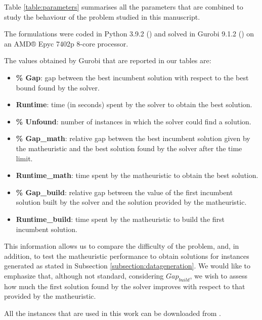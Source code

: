 \documentclass[a4paper,  review, authoryear, 1p.]{elsarticle}
\newcommand{\JP}[1]{{\color{blue}#1}}
\newcommand{\CV}[1]{{\color{blue}#1}}
\begin{document}
		\CV{Table \ref{table:parameters} summarises all the parameters that are combined to study the behaviour of the problem studied in this manuscript.}
		
		

		The formulations were coded in Python 3.9.2 (\citet{g.vanrossumguido1995}) and solved in Gurobi 9.1.2 (\citet{gurobioptimizationllc2022a}) on an AMD® Epyc 7402p 8-core processor. 
		
		\CV{
		The values obtained by Gurobi that are reported in our tables are:
		\begin{itemize}
			\item \textbf{\% Gap}: gap between the best incumbent solution with respect to the best bound found by the solver.
			\item \textbf{Runtime}: time (in seconds) spent by the solver to obtain the best solution.
			\item \textbf{\% Unfound}: number of instances in which the solver could find a solution.
			\item \textbf{\% Gap\_{math}}: relative gap between the best incumbent solution given by the matheuristic and the best solution found by the solver after the time limit.
			\item \textbf{Runtime\_{math}}: time spent by the matheuristic to obtain the best solution.
			\item \textbf{\% Gap\_{build}}: relative gap between the value of the first incumbent solution built by the solver and the solution provided by the matheuristic.
			\item \textbf{Runtime\_{build}}: time spent by the matheuristic to build the first incumbent solution.
		\end{itemize}
		
		This information allows us to compare the difficulty of the problem, and, in addition, to test the matheuristic performance to obtain solutions for instances generated as stated in Subsection \ref{subsection:datageneration}. \JP{We would like to emphasize that, although not standard,  considering $Gap_{build}$, we wish to assess  how much the first solution found by the solver improves with respect to that provided by the matheuristic.}}
		
		\CV{All the instances that are used in this work can be downloaded from \cite{valverde2023}.}
			 
\end{document}
